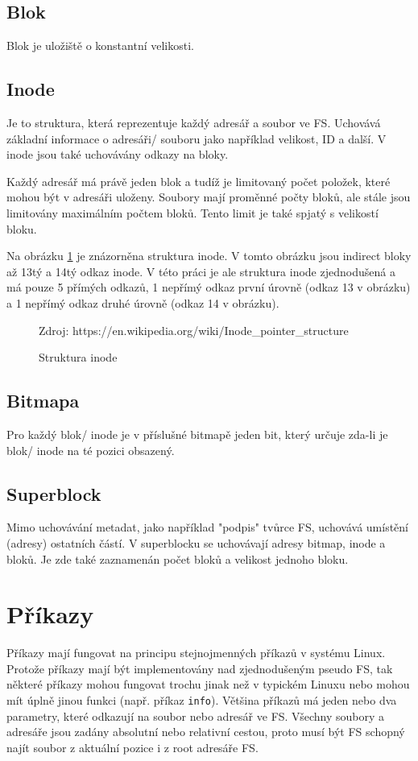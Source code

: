 \documentclass[12pt]{report}
\begin{document}
\subsection{Blok}
Blok je uložiště o konstantní velikosti.
%
\subsection{Inode}
Je to struktura, která reprezentuje každý adresář a soubor ve FS. Uchovává základní informace o
adresáři/ souboru jako například velikost, ID a další. V inode jsou také uchovávány odkazy na 
bloky.

Každý adresář má právě jeden blok a tudíž je limitovaný počet položek, které mohou být v adresáři
uloženy. Soubory mají proměnné počty bloků, ale stále jsou limitovány maximálním počtem bloků.
Tento limit je také spjatý s velikostí bloku.

Na obrázku \ref{img:inode_struct} je znázorněna struktura inode. V tomto obrázku jsou indirect
bloky až 13tý a 14tý odkaz inode. V této práci je ale struktura inode zjednodušená a má pouze 5
přímých odkazů, 1 nepřímý odkaz první úrovně (odkaz 13 v obrázku) a 1 nepřímý odkaz druhé úrovně
(odkaz 14 v obrázku).

\begin{figure}[H]
	\centering
	\def\svgwidth{\columnwidth}
	
	\caption{Struktura inode}
	Zdroj: https://en.wikipedia.org/wiki/Inode\_pointer\_structure
	\label{img:inode_struct}
\end{figure}
%
\subsection{Bitmapa}
Pro každý blok/ inode je v příslušné bitmapě jeden bit, který určuje zda-li je blok/ inode
na té pozici obsazený.
%
\subsection{Superblock}
Mimo uchovávání metadat, jako například "podpis" tvůrce FS, uchovává umístění (adresy) ostatních částí.
V superblocku se uchovávají adresy bitmap, inode a bloků. Je zde také zaznamenán počet bloků
a velikost jednoho bloku.
%
\section{Příkazy}
Příkazy mají fungovat na principu stejnojmenných příkazů v systému Linux. Protože příkazy mají být implementovány 
nad zjednodušeným pseudo FS, tak některé příkazy mohou fungovat trochu jinak než v typickém Linuxu nebo
mohou mít úplně jinou funkci (např. příkaz \texttt{info}). Většina příkazů má jeden nebo dva parametry,
které odkazují na soubor nebo adresář ve FS. 
Všechny soubory a adresáře jsou zadány absolutní nebo relativní cestou, proto musí být FS schopný
najít soubor z aktuální pozice i z root adresáře FS.
%
%
%
\end{document}
